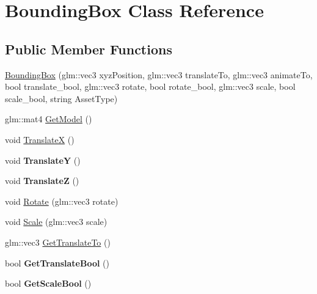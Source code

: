 \hypertarget{class_bounding_box}{}\section{Bounding\+Box Class Reference}
\label{class_bounding_box}
\subsection*{Public Member Functions}
\begin{DoxyCompactItemize}
\item 
\hyperlink{class_bounding_box_a4c5c018191c3a3dbba5633d62f249920}{Bounding\+Box} (glm\+::vec3 xyz\+Position, glm\+::vec3 translate\+To, glm\+::vec3 animate\+To, bool translate\+\_\+bool, glm\+::vec3 rotate, bool rotate\+\_\+bool, glm\+::vec3 scale, bool scale\+\_\+bool, string Asset\+Type)
\item 
glm\+::mat4 \hyperlink{class_bounding_box_a5fd1769f7157e7df40a6ab6a242fcfcc}{Get\+Model} ()
\item 
void \hyperlink{class_bounding_box_a9898275b1cd97761855156fc965412b1}{Translate\+X} ()
\item 
\hypertarget{class_bounding_box_aedff87fb2721b1e706e6e033e35b676b}{}void {\bfseries Translate\+Y} ()\label{class_bounding_box_aedff87fb2721b1e706e6e033e35b676b}

\item 
\hypertarget{class_bounding_box_a33d133625c7a1a6f6dd7628f00388fd5}{}void {\bfseries Translate\+Z} ()\label{class_bounding_box_a33d133625c7a1a6f6dd7628f00388fd5}

\item 
void \hyperlink{class_bounding_box_a728a3700574a5d9fbcac6d94561336ed}{Rotate} (glm\+::vec3 rotate)
\item 
void \hyperlink{class_bounding_box_ab84e48c88a509b20a469ccf5e23c4f11}{Scale} (glm\+::vec3 scale)
\item 
glm\+::vec3 \hyperlink{class_bounding_box_a45332d45575fe93b516267436abcd4fe}{Get\+Translate\+To} ()
\item 
\hypertarget{class_bounding_box_a501c1fd40b00ce6295fd60e1ed8cd92c}{}bool {\bfseries Get\+Translate\+Bool} ()\label{class_bounding_box_a501c1fd40b00ce6295fd60e1ed8cd92c}

\item 
\hypertarget{class_bounding_box_a262907e4b68e555edc57b21faef5685b}{}bool {\bfseries Get\+Scale\+Bool} ()\label{class_bounding_box_a262907e4b68e555edc57b21faef5685b}


\end{DoxyCompactItemize}
